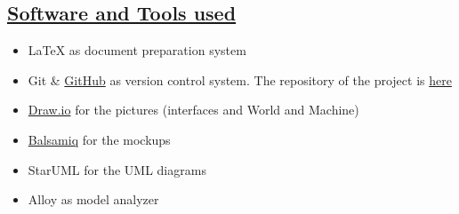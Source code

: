 \begin{appendices}
	\section[Software and Tools used]{\hyperlink{toc}{Software and Tools used}}
		\label{sec:softwareAndTools}
		
		\begin{itemize}
			\item \LaTeX{} as document preparation system
			\item Git \& \href{https://github.com/}{GitHub} as version control system. The repository of the project is \href{https://github.com/Megapiro/PaccianiPiro}{here}
			\item \href{https://www.draw.io/}{Draw.io} for the pictures (interfaces and World and Machine)
			\item \href{https://balsamiq.com/}{Balsamiq} for the mockups
			\item StarUML for the UML diagrams
			\item Alloy as model analyzer
		\end{itemize}
	
\end{appendices}